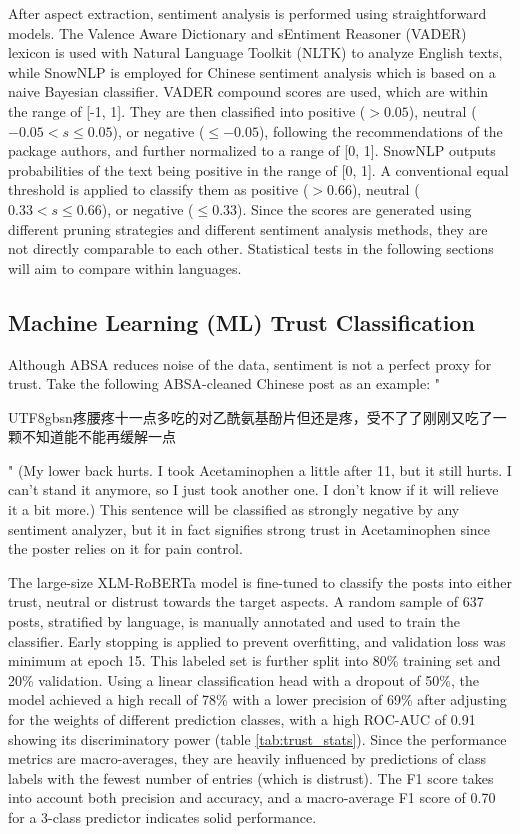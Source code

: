 \documentclass[11pt]{article}
\newcommand{\cn}[1]{\begin{CJK*}{UTF8}{gbsn}#1\end{CJK*}}
\begin{document}
After aspect extraction, sentiment analysis is performed using straightforward models. The Valence Aware Dictionary and sEntiment Reasoner (VADER) lexicon is used with Natural Language Toolkit (NLTK) to analyze English texts, while SnowNLP is employed for Chinese sentiment analysis which is based on a naive Bayesian classifier. VADER compound scores are used, which are within the range of [-1, 1]. They are then classified into positive ($> 0.05$), neutral ($-0.05 < s \leq 0.05$), or negative ($\leq -0.05$), following the recommendations of the package authors, and further normalized to a range of [0, 1]. SnowNLP outputs probabilities of the text being positive in the range of [0, 1]. A conventional equal threshold is applied to classify them as positive ($>0.66$), neutral ($0.33 < s \leq 0.66$), or negative ($\leq 0.33$). Since the scores are generated using different pruning strategies and different sentiment analysis methods, they are not directly comparable to each other. Statistical tests in the following sections will aim to compare within languages.

\subsection{Machine Learning (ML) Trust Classification}

Although ABSA reduces noise of the data, sentiment is not a perfect proxy for trust. Take the following ABSA-cleaned Chinese post as an example: "\cn{疼腰疼十一点多吃的对乙酰氨基酚片但还是疼，受不了了刚刚又吃了一颗不知道能不能再缓解一点}" (My lower back hurts. I took Acetaminophen a little after 11, but it still hurts. I can't stand it anymore, so I just took another one.  I don't know if it will relieve it a bit more.) This sentence will be classified as strongly negative by any sentiment analyzer, but it in fact signifies strong trust in Acetaminophen since the poster relies on it for pain control.

The large-size XLM-RoBERTa model \parencite{DBLP:journals/corr/abs-1911-02116} is fine-tuned to classify the posts into either trust, neutral or distrust towards the target aspects. A random sample of 637 posts, stratified by language, is manually annotated and used to train the classifier. Early stopping is applied to prevent overfitting, and validation loss was minimum at epoch 15. This labeled set is further split into 80\% training set and 20\% validation. Using a linear classification head with a dropout of 50\%, the model achieved a high recall of 78\% with a lower precision of 69\% after adjusting for the weights of different prediction classes, with a high ROC-AUC of 0.91 showing its discriminatory power (table \ref{tab:trust_stats}). Since the performance metrics are macro-averages, they are heavily influenced by predictions of class labels with the fewest number of entries (which is distrust). The F1 score takes into account both precision and accuracy, and a macro-average F1 score of 0.70 for a 3-class predictor indicates solid performance.
\end{document}
